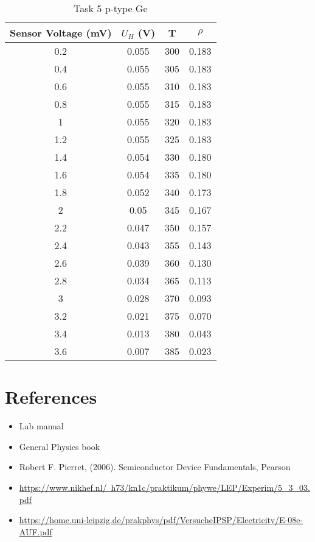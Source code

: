 \documentclass[11pt]{article}
\begin{document}
	\begin{table}[htbp]
		\centering
		\caption{Task 5 p-type Ge}
		\begin{tabular}{cccc}
			\toprule
			Sensor Voltage (mV) & $U_H$ (V) & T & $\rho$ \\
			\midrule
			0.2 & 0.055 & 300 & 0.183 \\
			0.4 & 0.055 & 305 & 0.183 \\
			0.6 & 0.055 & 310 & 0.183 \\
			0.8 & 0.055 & 315 & 0.183 \\
			1 & 0.055 & 320 & 0.183 \\
			1.2 & 0.055 & 325 & 0.183 \\
			1.4 & 0.054 & 330 & 0.180 \\
			1.6 & 0.054 & 335 & 0.180 \\
			1.8 & 0.052 & 340 & 0.173 \\
			2 & 0.05 & 345 & 0.167 \\
			2.2 & 0.047 & 350 & 0.157 \\
			2.4 & 0.043 & 355 & 0.143 \\
			2.6 & 0.039 & 360 & 0.130 \\
			2.8 & 0.034 & 365 & 0.113 \\
			3 & 0.028 & 370 & 0.093 \\
			3.2 & 0.021 & 375 & 0.070 \\
			3.4 & 0.013 & 380 & 0.043 \\
			3.6 & 0.007 & 385 & 0.023 \\
			\bottomrule
		\end{tabular}%
		\label{tab:9}%
	\end{table}%
	
	
	
	
	
	
	\clearpage
	
	\section{References}
	
	\begin{itemize}
		\item Lab manual
		\item General Physics book
		\item Robert F. Pierret, (2006). Semiconductor Device Fundamentals, Pearson
		\item \href{https://www.nikhef.nl/~h73/kn1c/praktikum/phywe/LEP/Experim/5_3_03.pdf}{https://www.nikhef.nl/~h73/kn1c/praktikum/phywe/LEP/Experim/5\_3\_03.pdf}
		\item \href{https://home.uni-leipzig.de/prakphys/pdf/VersucheIPSP/Electricity/E-08e-AUF.pdf}{https://home.uni-leipzig.de/prakphys/pdf/VersucheIPSP/Electricity/E-08e-AUF.pdf}
	\end{itemize}
	
\end{document}
